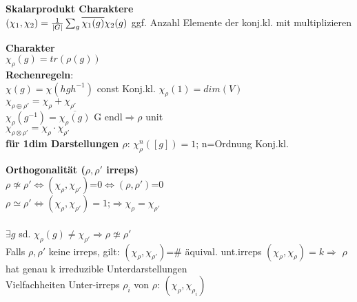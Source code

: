 \documentclass[8pt, a4paper, landscape]{extarticle}
\newcommand{\tit}[1]{\textbf{#1} \\}
\newcommand{\hi}[1]{\textcolor{Cerulean}{#1}}
\begin{document}
\begin{multicols*}{5}
\begin{ibox}
    \tit{Skalarprodukt Charaktere}
    $(\chi_1,\chi_2)=\frac{1}{\abs{G}}\sum_g \overline{\chi_1(g)}\chi_2(g)$
    ggf. Anzahl Elemente der konj.kl. mit multiplizieren
\end{ibox}

\begin{ibox}
    \tit{Charakter}
    $\chi_\rho(g)=tr(\rho(g))$\\
    \textbf{Rechenregeln}:\\
    \textbullet $\chi(g)=\chi(hgh^{-1})$ const Konj.kl.
    \textbullet $\chi_\rho(1)= dim(V)$\\
    \textbullet $\chi_{\rho \oplus \rho'} = \chi_\rho + \chi_{\rho'}$\\
    \textbullet $\chi_\rho(g^{-1})= \overline{\chi_{\rho}(g)}$ G endl$\Rightarrow\rho $ unit\\
    \textbullet $\chi_{\rho\otimes\rho'}= \chi_\rho \cdot \chi_{\rho'}$\\
    \textbf{für 1dim Darstellungen $\rho$}:
    $\chi_\rho^n([g])=1$; n=Ordnung Konj.kl.
\end{ibox}
\begin{ibox}
    \tit{Orthogonalität ($\rho,\rho'$ irreps)}
    $\rho \nsimeq \rho' \Leftrightarrow (\chi_\rho,\chi_{\rho'})$=0$\Leftrightarrow (\rho,\rho')$=0\\
    $\rho \simeq \rho' \Leftrightarrow (\chi_\rho,\chi_{\rho'})=1 $;$\Rightarrow \chi_\rho = \chi_{\rho'}$\\\\
    \textbullet $\exists g$ sd. $\chi_\rho(g)\neq \chi_{\rho'} \Rightarrow \rho \nsimeq \rho'$\\
    \textbullet Falls $\rho,\rho'$ keine irreps, gilt: $(\chi_\rho,\chi_{\rho'})$=\# äquival. unt.irreps
    \textbullet $(\chi_\rho,\chi_\rho)=k\Rightarrow$ $\rho$ hat genau k irreduzible Unterdarstellungen\\
    \textbullet \hi{Vielfachheiten}  Unter-irreps $\rho_i$ von $\rho$: $(\chi_\rho,\chi_{\rho_i})$
\end{ibox}



\end{multicols*}
\end{document}
